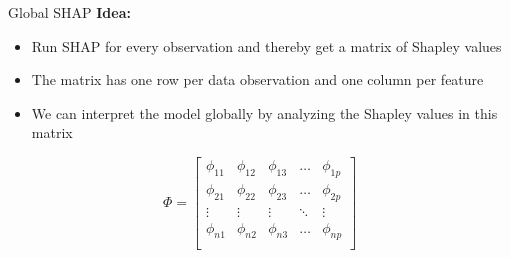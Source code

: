\documentclass[11pt,compress,t,notes=noshow, aspectratio=169, xcolor=table]{beamer}
\begin{document}




 \begin{frame}{Global SHAP }
\textbf{Idea: }
\begin{itemize}
    \item Run SHAP for every observation and thereby get a matrix of Shapley values
    \item The matrix has one row per data observation and one column per feature
    \item We can interpret the model globally by analyzing the Shapley values in this matrix
\end{itemize}
\vspace{2cm}
$$
\Phi =
\begin{bmatrix}
    \phi_{11} & \phi_{12} & \phi_{13} & \dots  & \phi_{1p} \\
    \phi_{21} & \phi_{22} & \phi_{23} & \dots  & \phi_{2p} \\
    \vdots & \vdots & \vdots & \ddots & \vdots \\
    \phi_{n1} & \phi_{n2} & \phi_{n3} & \dots  & \phi_{np} \\
\end{bmatrix}
$$

 \end{frame}
\end{document}

